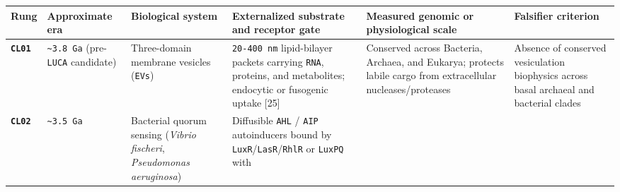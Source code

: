 \documentclass[10pt,letterpaper]{article}
\begin{document}
{\scriptsize\setlength{\tabcolsep}{3.0pt}\renewcommand{\arraystretch}{1.14}
\begin{longtable}[]{@{}
  >{\raggedright\arraybackslash}p{}
  >{\raggedright\arraybackslash}p{}
  >{\raggedright\arraybackslash}p{}
  >{\raggedright\arraybackslash}p{}
  >{\raggedright\arraybackslash}p{}
  >{\raggedright\arraybackslash}p{}@{}}
\toprule\noalign{}
\begin{minipage}[b]{\linewidth}\raggedright
\textbf{Rung}
\end{minipage} & \begin{minipage}[b]{\linewidth}\raggedright
\textbf{Approximate era}
\end{minipage} & \begin{minipage}[b]{\linewidth}\raggedright
\textbf{Biological system}
\end{minipage} & \begin{minipage}[b]{\linewidth}\raggedright
\textbf{Externalized substrate and receptor gate}
\end{minipage} & \begin{minipage}[b]{\linewidth}\raggedright
\textbf{Measured genomic or physiological scale}
\end{minipage} & \begin{minipage}[b]{\linewidth}\raggedright
\textbf{Falsifier criterion}
\end{minipage} \\
\midrule\noalign{}
\endhead
\bottomrule\noalign{}
\endlastfoot
\textbf{\texttt{CL01}} & \texttt{\textasciitilde{}3.8\ Ga}
(pre-\texttt{LUCA} candidate) & Three-domain membrane vesicles
(\texttt{EVs}) & \texttt{20-\allowbreak{}400\ nm} lipid-bilayer packets carrying
\texttt{RNA}, proteins, and metabolites; endocytic or fusogenic uptake
{[}25{]} & Conserved across Bacteria, Archaea, and Eukarya; protects
labile cargo from extracellular nucleases/proteases & Absence of
conserved vesiculation biophysics across basal archaeal and bacterial
clades \\
\textbf{\texttt{CL02}} & \texttt{\textasciitilde{}3.5\ Ga} & Bacterial
quorum sensing (\emph{Vibrio fischeri}, \emph{Pseudomonas aeruginosa}) &
Diffusible \texttt{AHL} / \texttt{AIP} autoinducers bound by
\texttt{LuxR}/\allowbreak{}\texttt{LasR}/\allowbreak{}\texttt{RhlR} or \texttt{LuxPQ} with

\end{longtable}}
\end{document}
